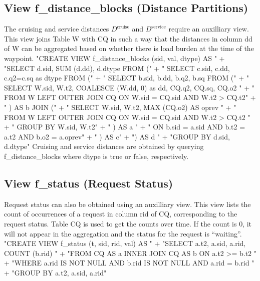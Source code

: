 \subsection{View f\_distance\_blocks (Distance Partitions)}
The cruising and service distances $D^\textrm{cruise}$ and $D^\textrm{service}$
require an auxilliary view. This view joins Table W with
CQ in such a way that the distances in column \textsf{dd} of W
can be aggregated based on whether there is load burden at the time of the
waypoint.
\nwenddocs{}\endmoddef{}
"CREATE VIEW f_distance_blocks (sid, val, dtype) AS "
  + "SELECT d.sid, SUM (d.dd), d.dtype FROM ("
  + "  SELECT c.sid, c.dd, c.q2=c.sq as dtype FROM ("
  + "    SELECT b.sid, b.dd, b.q2, b.sq FROM ("
  + "      SELECT W.sid, W.t2, COALESCE (W.dd, 0) as dd, CQ.q2, CQ.sq, CQ.o2 "
  + "      FROM W LEFT OUTER JOIN CQ ON W.sid = CQ.sid AND W.t2 > CQ.t2"
  + "    ) AS b JOIN ("
  + "      SELECT W.sid, W.t2, MAX (CQ.o2) AS oprev "
  + "      FROM W LEFT OUTER JOIN CQ ON W.sid = CQ.sid AND W.t2 > CQ.t2 "
  + "      GROUP BY W.sid, W.t2"
  + "    ) AS a "
  + "    ON b.sid = a.sid AND b.t2 = a.t2 AND b.o2 = a.oprev"
  + "  ) AS c"
  + ") AS d "
  + "GROUP BY d.sid, d.dtype"
\nwendcode{}Cruising and service distances are obtained by querying
f\_distance\_blocks where \textsf{dtype} is true or false, respectively.

\subsection{View f\_status (Request Status)}
Request status can also be obtained using an auxilliary view.  This view lists
the count of occurrences of a request in column \textsf{rid} of CQ,
corresponding to the request status.  Table CQ is used to get the counts over
time.  If the count is 0, it will not appear in the aggregation and the status
for the request is ``waiting''.
\nwenddocs{}\endmoddef{}
"CREATE VIEW f_status (t, sid, rid, val) AS "
  + "SELECT a.t2, a.sid, a.rid, COUNT (b.rid) "
  + "FROM CQ AS a INNER JOIN CQ AS b ON a.t2 >= b.t2 "
  + "WHERE a.rid IS NOT NULL AND b.rid IS NOT NULL AND a.rid = b.rid "
  + "GROUP BY a.t2, a.sid, a.rid"
\nwendcode{}\nwdocspar

